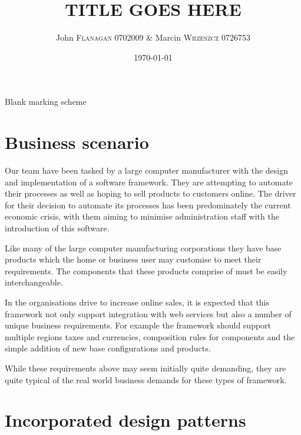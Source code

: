 \documentclass[pdftex,11pt,a4paper]{article}
\author{John \textsc{Flanagan} 0702009 \& Marcin \textsc{Wrzeszcz} 0726753 }
\title{TITLE GOES HERE}
\date{\today}
\begin{document}


\begin{center}
	Blank marking scheme
\end{center}

\pagebreak

\tableofcontents
\pagebreak

\section{Business scenario}
Our team have been tasked by a large computer manufacturer with the design and implementation of a software framework. They are attempting to automate their processes as well as hoping to sell products to customers online. The driver for their decision to automate its processes has been predominately the current economic crisis, with them aiming to minimise administration staff with the introduction of this software. 

Like many of the large computer manufacturing corporations they have base products which the home or business user may customise to meet their requirements. The components that these products comprise of must be easily interchangeable. 

In the organisations drive to increase online sales, it is expected that this framework not only support integration with web services but also a number of unique business requirements. For example the framework should support multiple regions taxes and currencies, composition rules for components and the simple addition of new base configurations and products.

While these requirements above may seem initially quite demanding, they are quite typical of the real world business demands for these types of framework.

\pagebreak
\section{Incorporated design patterns}
\end{document}
